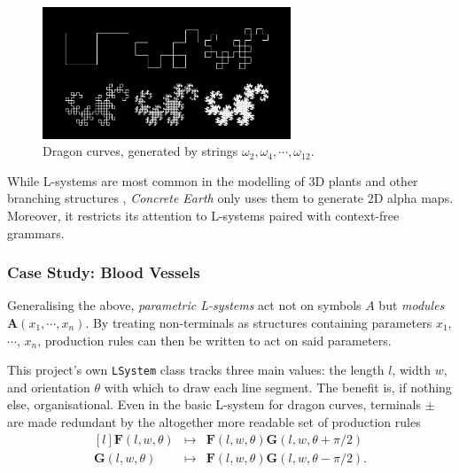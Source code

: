 \documentclass[a4paper, 11pt]{article}
\begin{document}
\begin{flushleft}
\vspace{5pt}\noindent
\begin{figure}[h]
\centering
\includegraphics[width=0.66\textwidth]{Dragon Curves}
\caption{Dragon curves, generated by strings $\omega_2, \omega_4, \cdots, \omega_{12}$.}
\label{Dragon Curves}
\end{figure}

\vspace{5pt}\noindent
While L-systems are most common in the modelling of 3D plants and other branching structures \citep{prusinkiewiczAlgorithmicBeauty}, \textit{Concrete Earth} only uses them to generate 2D alpha maps. Moreover, it restricts its attention to L-systems paired with context-free grammars.

\subsubsection{Case Study: Blood Vessels}

Generalising the above, \textit{parametric L-systems} act not on symbols $A$ but \textit{modules} $\mathbf{A}(x_1,\cdots,x_n)$. By treating non-terminals as structures containing parameters $x_1$, $\cdots$, $x_n$, production rules can then be written to act on said parameters.

\vspace{5pt}\noindent
This project's own \texttt{LSystem} class tracks three main values: the length $l$, width $w$, and orientation $\theta$ with which to draw each line segment. The benefit is, if nothing else, organisational. Even in the basic L-system for dragon curves, terminals $\pm$ are made redundant by the altogether more readable set of production rules
$$\begin{matrix*}[l]
\mathbf{F}(l,w,\theta) &\mapsto &\mathbf{F}(l,w,\theta)\mathbf{G}(l,w,\theta+\pi/2) \\
\mathbf{G}(l,w,\theta) &\mapsto &\mathbf{F}(l,w,\theta)\mathbf{G}(l,w,\theta-\pi/2).
\end{matrix*}$$


\end{flushleft}
\end{document}
